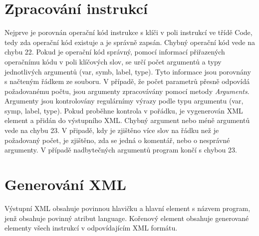 \documentclass[a4paper, 10pt]{article}
\begin{document}
\section{Zpracování instrukcí}
\qquad Nejprve je porovnán operační kód instrukce s klíči v poli instrukcí ve třídě Code, tedy zda operační kód existuje a je správně zapsán. Chybný operační kód vede na chybu 22. Pokud je operační kód správný, pomocí informací přiřazených operačnímu kódu v poli klíčových slov, se určí počet argumentů a typy jednotlivých argumentů (var, symb, label, type). Tyto informace jsou porovnány s načteným řádkem ze souboru. V případě,  že počet parametrů přesně odpovídá požadovanému počtu, jsou argumenty zpracovávány pomocí metody \emph{Arguments}. Argumenty jsou kontrolovány regulárnímy výrazy podle typu argumentu (var, symp, label, type). Pokud proběhne kontrola v pořádku, je vygenerován XML element a přidán do výstupního XML. Chybný argument nebo méně argumentů vede na chybu 23. V připadě, kdy je zjištěno více slov na řádku než je požadovaný počet, je zjištěno, zda se jedná o komentář, nebo o nesprávné argumenty. V případě nadbytečných argumentů program končí s chybou 23. 


\section{Generování XML}
\qquad Výstupní XML obsahuje povinnou hlavičku a hlavní element s názvem program, jenž obsahuje povinný atribut language. Kořenový element obsahuje generované elementy všech instrukcí v odpovídajícím XML formátu.
\end{document}
